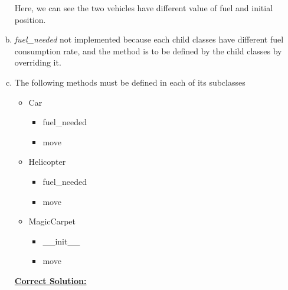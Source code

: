 \documentclass[12pt]{article}
\begin{document}
\begin{enumerate}[a.]
    \bigskip

    Here, we can see the two vehicles have different value of fuel and initial position.

    \item

    \textit{fuel\_needed} not implemented because each child classes have different
    fuel consumption rate, and the method is to be defined by the child classes by
    overriding it.

    \item

    The following methods must be defined in each of its subclasses

    \bigskip

    \begin{itemize}
        \item Car
        \begin{itemize}
            \item fuel\_needed
            \item move
        \end{itemize}
        \item Helicopter
        \begin{itemize}
            \item fuel\_needed
            \item move
        \end{itemize}
        \item MagicCarpet
        \begin{itemize}
            \item \_\_init\_\_
            \item move
        \end{itemize}
    \end{itemize}

    \bigskip

    \begin{mdframed}
        \underline{\textbf{Correct Solution:}}

        \bigskip


\end{mdframed}
\end{enumerate}
\end{document}
